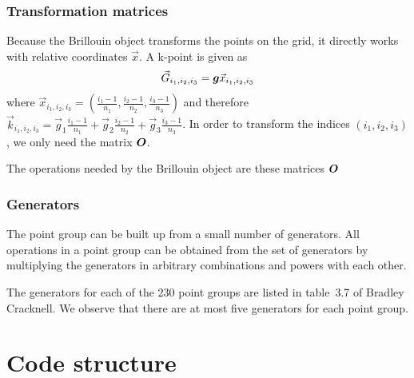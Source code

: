 \documentclass[11pt,a4paper]{report}
\begin{document}
\subsubsection{Transformation matrices}
Because the Brillouin object transforms the points on the grid, it
directly works with relative coordinates $\vec{x}$. A k-point is given as
\begin{eqnarray}
\vec{G}_{i_1,i_2,i_3}=\bm{g}\vec{x}_{i_1,i_2,i_3}
\end{eqnarray}
where
$\vec{x}_{i_1,i_2,i_3}=(\frac{i_1-1}{n_1},\frac{i_2-1}{n_2},\frac{i_3-1}{n_3})$
and therefore $\vec{k}_{i_1,i_2,i_3}= \vec{g}_1
\frac{i_1-1}{n_1}+\vec{g}_2 \frac{i_2-1}{n_2} +\vec{g}_3\frac{i_3-1}{n_3}$.
In order to transform the indices $(i_1,i_2,i_3)$, we only need the
matrix $\bm{O}$.

The operations needed by the Brillouin object are these matrices
$\bm{O}$

\subsubsection{Generators}
The point group can be built up from a small number of generators.
All operations in a point group can be obtained from the set of
generators by multiplying the generators in arbitrary combinations
and powers with each other. 

The generators for each of the 230 point groups are listed in
table~3.7 of Bradley Cracknell. We observe that there are at most five
generators for each point group.

\section{Code structure}
\end{document}
